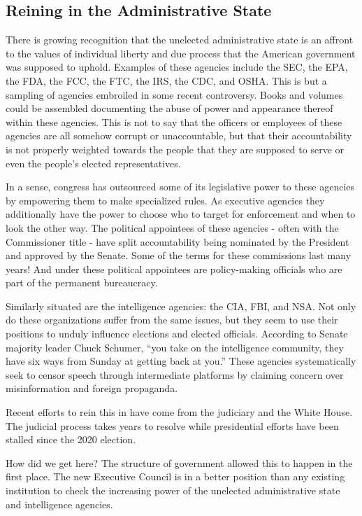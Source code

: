 \documentclass{article}
\newcommand{\quotes}[1]{``#1''}
\begin{document}
\subsection{Reining in the Administrative State}

There is growing recognition that the unelected administrative state is an affront to the values of individual liberty and due process that the American government was supposed to uphold. Examples of these agencies include the SEC, the EPA, the FDA, the FCC, the FTC, the IRS, the CDC, and OSHA. This is but a sampling of agencies embroiled in some recent controversy. Books and volumes could be assembled documenting the abuse of power and appearance thereof within these agencies. This is not to say that the officers or employees of these agencies are all somehow corrupt or unaccountable, but that their accountability is not properly weighted towards the people that they are supposed to serve or even the people's elected representatives.

In a sense, congress has outsourced some of its legislative power to these agencies by empowering them to make specialized rules. As executive agencies they additionally have the power to choose who to target for enforcement and when to look the other way. The political appointees of these agencies - often with the Commissioner title - have split accountability being nominated by the President and approved by the Senate. Some of the terms for these commissions last many years! And under these political appointees are policy-making officials who are part of the permanent bureaucracy.

Similarly situated are the intelligence agencies: the CIA, FBI, and NSA. Not only do these organizations suffer from the same issues, but they seem to use their positions to unduly influence elections and elected officials. According to Senate majority leader Chuck Schumer\cite{Stanley}, \quotes{you take on the intelligence community, they have six ways from Sunday at getting back at you.} These agencies systematically seek to censor speech through intermediate platforms by claiming concern over misinformation and foreign propaganda\cite{Beanz}.

Recent efforts to rein this in have come from the judiciary\cite{Crowell} and the White House\cite{ScheduleF}. The judicial process takes years to resolve while presidential efforts have been stalled since the 2020 election.

How did we get here? The structure of government allowed this to happen in the first place. The new Executive Council is in a better position than any existing institution to check the increasing power of the unelected administrative state and intelligence agencies.
\end{document}
